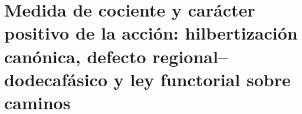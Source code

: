 \chapter{Medida de cociente y carácter positivo de la acción: hilbertización canónica, defecto regional--dodecafásico y ley functorial sobre caminos}
\label{chap:p3-final:35:medida_accion_positiva}

